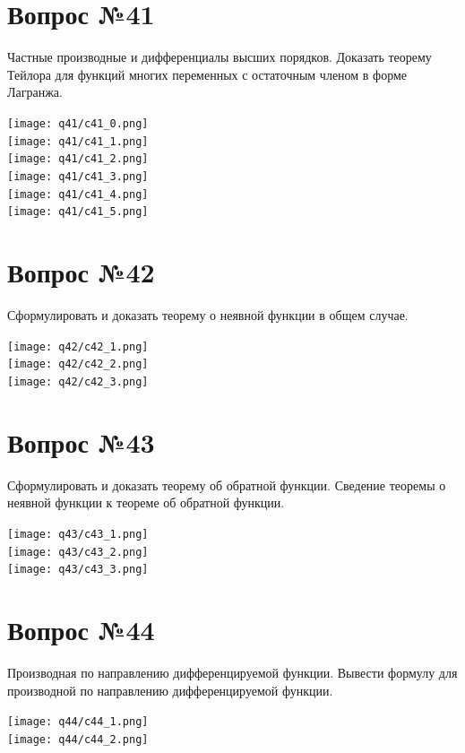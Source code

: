 \documentclass[12pt]{report}
\numberwithin{equation}{section}
\begin{document}
\newpage \section{Вопрос №41} 
\begin{framed}
Частные производные и дифференциалы высших порядков. Доказать теорему Тейлора для функций многих переменных с остаточным членом в форме Лагранжа.
\end{framed}
\begin{center}
\texttt{[image: q41/c41\_0.png]}\\
\texttt{[image: q41/c41\_1.png]}\\
\texttt{[image: q41/c41\_2.png]}\\
\texttt{[image: q41/c41\_3.png]}\\
\texttt{[image: q41/c41\_4.png]}\\
\texttt{[image: q41/c41\_5.png]}\\\end{center}


\newpage \section{Вопрос №42} 
\begin{framed}
Сформулировать и доказать теорему о неявной функции в общем случае.
\end{framed}\begin{center}
\texttt{[image: q42/c42\_1.png]}\\
\texttt{[image: q42/c42\_2.png]}\\
\texttt{[image: q42/c42\_3.png]}\\
\end{center}


\newpage \section{Вопрос №43} 
\begin{framed}
Сформулировать и доказать теорему об обратной функции. Сведение теоремы о неявной функции к теореме об обратной функции.
\end{framed}\begin{center}
\texttt{[image: q43/c43\_1.png]}\\
\texttt{[image: q43/c43\_2.png]}\\
\texttt{[image: q43/c43\_3.png]}\\
\end{center}

\newpage \section{Вопрос №44} 
\begin{framed}
Производная по направлению дифференцируемой функции. Вывести формулу для производной по направлению дифференцируемой функции.
\end{framed}\begin{center}
\texttt{[image: q44/c44\_1.png]}\\
\texttt{[image: q44/c44\_2.png]}\\
\end{center}
\end{document}
